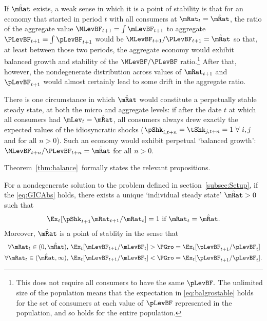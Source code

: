 \documentclass[BufferStockTheory]{subfiles}
\begin{document}
If $\mBal$ exists, a weak sense in which it is a point of stability is that for an economy that started in period $t$ with all consumers at $\mRat_{t}=\mBal$, the ratio of the aggregate value $\MLevBF_{t+1}= \int \mLevBF_{t+1}$ to aggregate $\PLevBF_{t+1}= \int \pLevBF_{t+1}$ would be $\MLevBF_{t+1}/\PLevBF_{t+1}=\mBal$ so that, at least between those two periods, the aggregate economy would exhibit balanced growth and stability of the $\MLevBF/\PLevBF$ ratio.\footnote{This does not require all consumers to have the same $\pLevBF.$  The unlimited size of the population means that the expectation in \eqref{eq:balgrostable} holds for the set of consumers at each value of $\pLevBF$ represented in the population, and so holds for the entire population.}  After that, however, the nondegenerate distribution across values of $\mRat_{t+1}$ and $\pLevBF_{t+1}$ would almost certainly lead to some drift in the aggregate ratio.

There is one circumstance in which $\mBal$ would constitute a perpetually stable steady state, at both the micro and aggregate levels:  if after the date $t$ at which all consumers had $\mLev_{t}=\mBal$, all consumers always drew exactly the expected values of the idiosyncratic shocks ($\pShk_{i,t+n}=\tShk_{j,t+n}=1~\forall~i,j$ and for all $n>0$).  Such an economy would exhibit perpetual `balanced growth': $\MLevBF_{t+n}/\PLevBF_{t+n} = \mBal$ for all $n>0$.  

Theorem~\ref{thm:balance}~formally states the relevant propositions.

\begin{theorem}
  \label{thm:balance} For a nondegenerate solution to the problem defined in section~\ref{subsec:Setup}, if the {\GIC} \eqref{eq:GICAbs} holds, 
  there exists a unique `individual steady state' $\mBal>0$ such that
  \begin{equation}  
    \Ex_t [\pShk_{t+1}{\mRat}_{t+1}/\mRat_t] = 1 \mbox{~if~} \mRat_t = \mBal. 
    \label{eq:mBalance}
  \end{equation}
Moreover, $\mBal$ is a point of stablity in the sense that
  \begin{align}\label{eq:stabilitybal}
    \forall {\mRat}_t\in(0,\mBal),      \,\,& \Ex_t [{\mLevBF}_{t+1}/\mLevBF_{t}] > \PGro = \Ex_{t}[\pLevBF_{t+1}/\pLevBF_{t}] \\
    \forall {\mRat}_t\in(\mBal,\infty), \,\,& \Ex_t [\mLevBF_{t+1}/\mLevBF_{t}] < \PGro= \Ex_{t}[\pLevBF_{t+1}/\pLevBF_{t}]. \notag
  \end{align}
\end{theorem}
\end{document}
